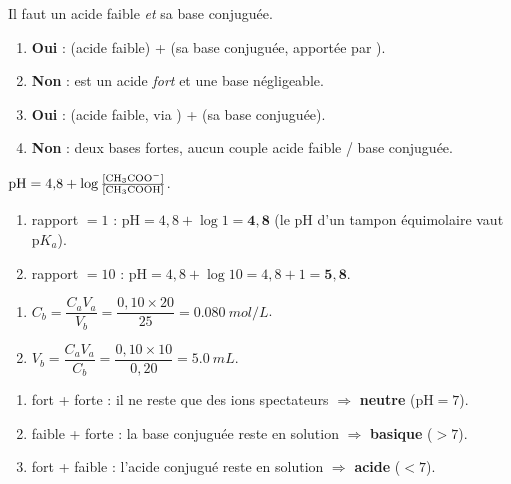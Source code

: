 \documentclass[11pt,a4paper]{article}
\begin{document}

\begin{corrige}
Il faut un acide faible \emph{et} sa base conjuguée.
\begin{enumerate}[label=\alph*)]
  \item \textbf{Oui} :  (acide faible) +  (sa base conjuguée, apportée par ).
  \item \textbf{Non} :  est un acide \emph{fort} et  une base négligeable.
  \item \textbf{Oui} :  (acide faible, via ) +  (sa base conjuguée).
  \item \textbf{Non} : deux bases fortes, aucun couple acide faible / base conjuguée.
\end{enumerate}
\end{corrige}

\begin{corrige}
$\mathrm{pH} = 4{,}8 + \log\frac{[\ce{CH3COO-}]}{[\ce{CH3COOH}]}$.
\begin{enumerate}[label=\alph*)]
  \item rapport $= 1$ : $\mathrm{pH} = 4{,}8 + \log 1 = \mathbf{4{,}8}$ (le pH d'un tampon équimolaire vaut $\mathrm{p}K_a$).
  \item rapport $= 10$ : $\mathrm{pH} = 4{,}8 + \log 10 = 4{,}8 + 1 = \mathbf{5{,}8}$.
\end{enumerate}
\end{corrige}

\begin{corrige}
\begin{enumerate}[label=\alph*)]
  \item $C_b = \dfrac{C_a V_a}{V_b} = \dfrac{0{,}10 \times 20}{25} = \qty{0,080}{mol\per L}$.
  \item $V_b = \dfrac{C_a V_a}{C_b} = \dfrac{0{,}10 \times 10}{0{,}20} = \qty{5,0}{mL}$.
\end{enumerate}
\end{corrige}

\begin{corrige}
\begin{enumerate}[label=\alph*)]
  \item fort + forte : il ne reste que des ions spectateurs $\Rightarrow$ \textbf{neutre} ($\mathrm{pH}=7$).
  \item faible + forte : la base conjuguée  reste en solution $\Rightarrow$ \textbf{basique} ($>7$).
  \item fort + faible : l'acide conjugué  reste en solution $\Rightarrow$ \textbf{acide} ($<7$).
\end{enumerate}
\end{corrige}
\end{document}
